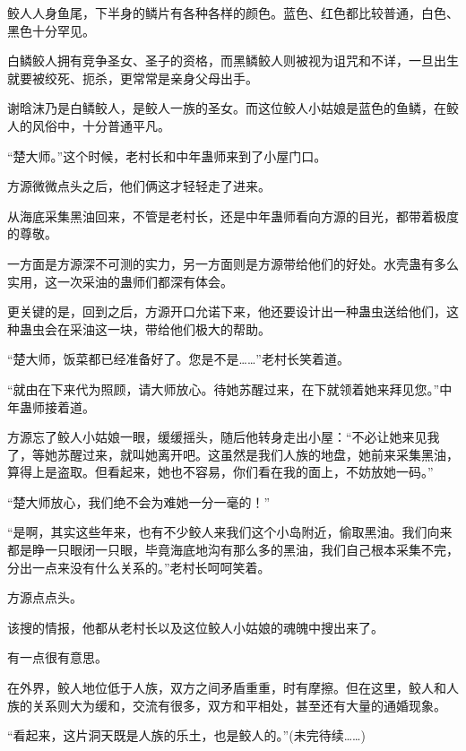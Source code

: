 \begin{this_body}
鲛人人身鱼尾，下半身的鳞片有各种各样的颜色。蓝色、红色都比较普通，白色、黑色十分罕见。

白鳞鲛人拥有竞争圣女、圣子的资格，而黑鳞鲛人则被视为诅咒和不详，一旦出生就要被绞死、扼杀，更常常是亲身父母出手。

谢晗沫乃是白鳞鲛人，是鲛人一族的圣女。而这位鲛人小姑娘是蓝色的鱼鳞，在鲛人的风俗中，十分普通平凡。

“楚大师。”这个时候，老村长和中年蛊师来到了小屋门口。

方源微微点头之后，他们俩这才轻轻走了进来。

从海底采集黑油回来，不管是老村长，还是中年蛊师看向方源的目光，都带着极度的尊敬。

一方面是方源深不可测的实力，另一方面则是方源带给他们的好处。水壳蛊有多么实用，这一次采油的蛊师们都深有体会。

更关键的是，回到之后，方源开口允诺下来，他还要设计出一种蛊虫送给他们，这种蛊虫会在采油这一块，带给他们极大的帮助。

“楚大师，饭菜都已经准备好了。您是不是……”老村长笑着道。

“就由在下来代为照顾，请大师放心。待她苏醒过来，在下就领着她来拜见您。”中年蛊师接着道。

方源忘了鲛人小姑娘一眼，缓缓摇头，随后他转身走出小屋：“不必让她来见我了，等她苏醒过来，就叫她离开吧。这虽然是我们人族的地盘，她前来采集黑油，算得上是盗取。但看起来，她也不容易，你们看在我的面上，不妨放她一码。”

“楚大师放心，我们绝不会为难她一分一毫的！”

“是啊，其实这些年来，也有不少鲛人来我们这个小岛附近，偷取黑油。我们向来都是睁一只眼闭一只眼，毕竟海底地沟有那么多的黑油，我们自己根本采集不完，分出一点来没有什么关系的。”老村长呵呵笑着。

方源点点头。

该搜的情报，他都从老村长以及这位鲛人小姑娘的魂魄中搜出来了。

有一点很有意思。

在外界，鲛人地位低于人族，双方之间矛盾重重，时有摩擦。但在这里，鲛人和人族的关系则大为缓和，交流有很多，双方和平相处，甚至还有大量的通婚现象。

“看起来，这片洞天既是人族的乐土，也是鲛人的。”(未完待续……)

\end{this_body}

